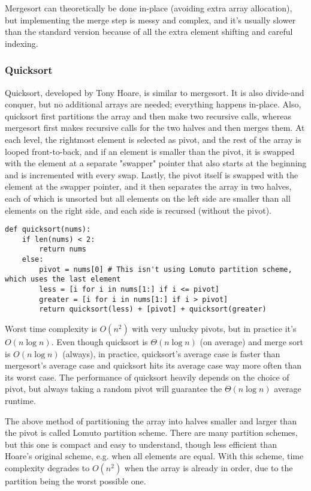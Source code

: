 \documentclass[8pt, table, xcdraw]{article}%
\begin{document}
Mergesort can theoretically be done in-place (avoiding extra array allocation), but implementing the merge step is messy and complex, and it's usually slower than the standard version because of all the extra element shifting and careful indexing.

\subsubsection{Quicksort} \label{quicksort}

Quicksort, developed by Tony Hoare, is similar to mergesort. It is also divide-and conquer, but no additional arrays are needed; everything happens in-place. Also, quicksort first partitions the array and then make two recursive calls, whereas mergesort first makes recursive calls for the two halves and then merges them. At each level, the rightmost element is selected as pivot, and the rest of the array is looped front-to-back, and if an element is smaller than the pivot, it is swapped with the element at a separate "swapper" pointer that also starts at the beginning and is incremented with every swap. Lastly, the pivot itself is swapped with the element at the swapper pointer, and it then separates the array in two halves, each of which is unsorted but all elements on the left side are smaller than all elements on the right side, and each side is recursed (without the pivot).

\begin{lstlisting}
def quicksort(nums):
    if len(nums) < 2:
        return nums
    else:
        pivot = nums[0] # This isn't using Lomuto partition scheme, which uses the last element
        less = [i for i in nums[1:] if i <= pivot]
        greater = [i for i in nums[1:] if i > pivot]
        return quicksort(less) + [pivot] + quicksort(greater)
\end{lstlisting}

Worst time complexity is $O(n^2)$ with very unlucky pivots, but in practice it's $O(n \log n)$. Even though quicksort is $\Theta(n \log n)$ (on average) and merge sort is $O(n \log n)$ (always), in practice, quicksort's average case is faster than mergesort's average case and quicksort hits its average case way more often than its worst case. The performance of quicksort heavily depends on the choice of pivot, but always taking a random pivot will guarantee the $\Theta(n \log n)$ average runtime.

The above method of partitioning the array into halves smaller and larger than the pivot is called Lomuto partition scheme. There are many partition schemes, but this one is compact and easy to understand, though less efficient than Hoare's original scheme, e.g. when all elements are equal. With this scheme, time complexity degrades to $O(n^2)$ when the array is already in order, due to the partition being the worst possible one.
\end{document}
